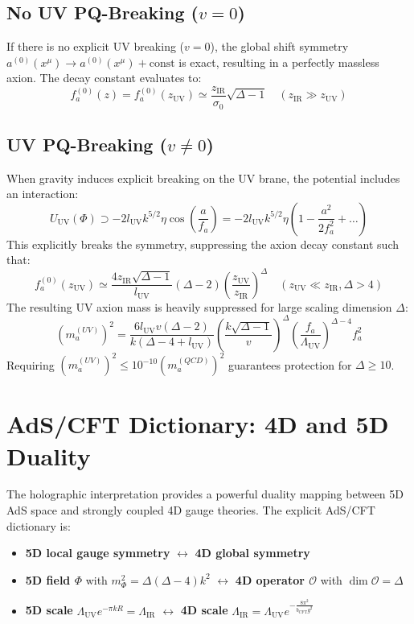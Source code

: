 \documentclass[11pt]{article}
\begin{document}
\subsection{No UV PQ-Breaking ($v = 0$)}
If there is no explicit UV breaking ($v = 0$), the global shift symmetry $a^{(0)}(x^\mu) \to a^{(0)}(x^\mu) + \text{const}$ is exact, resulting in a perfectly massless axion. The decay constant evaluates to:
\begin{equation}
    f_a^{(0)}(z) = f_a^{(0)}(z_{\text{UV}}) \simeq \frac{z_{\text{IR}}}{\sigma_0} \sqrt{\Delta-1} \quad (z_{\text{IR}} \gg z_{\text{UV}})
\end{equation}

\subsection{UV PQ-Breaking ($v \neq 0$)}
When gravity induces explicit breaking on the UV brane, the potential includes an interaction:
\begin{equation}
    U_{\text{UV}}(\Phi) \supset -2 l_{\text{UV}} k^{5/2} \eta \cos\left(\frac{a}{f_a}\right) = -2 l_{\text{UV}} k^{5/2} \eta \left(1 - \frac{a^2}{2f_a^2} + \dots \right)
\end{equation}
This explicitly breaks the symmetry, suppressing the axion decay constant such that:
\begin{equation}
    f_a^{(0)}(z_{\text{UV}}) \simeq \frac{4 z_{\text{IR}} \sqrt{\Delta-1}}{l_{\text{UV}}} (\Delta-2) \left(\frac{z_{\text{UV}}}{z_{\text{IR}}}\right)^\Delta \quad (z_{\text{UV}} \ll z_{\text{IR}}, \Delta > 4)
\end{equation}
The resulting UV axion mass is heavily suppressed for large scaling dimension $\Delta$:
\begin{equation}
    (m_a^{(UV)})^2 = \frac{6 l_{\text{UV}} v (\Delta-2)}{k(\Delta-4+l_{\text{UV}})} \left( \frac{k\sqrt{\Delta-1}}{v} \right)^\Delta \left(\frac{f_a}{\Lambda_{\text{UV}}}\right)^{\Delta-4} f_a^2
\end{equation}
Requiring $(m_a^{(UV)})^2 \le 10^{-10} (m_a^{(QCD)})^2$ guarantees protection for $\Delta \ge 10$.

\section{AdS/CFT Dictionary: 4D and 5D Duality}
The holographic interpretation provides a powerful duality mapping between 5D AdS space and strongly coupled 4D gauge theories. The explicit AdS/CFT dictionary is:
\begin{itemize}
    \item \textbf{5D local gauge symmetry} $\leftrightarrow$ \textbf{4D global symmetry}
    \item \textbf{5D field $\Phi$} with $m_\Phi^2 = \Delta(\Delta-4)k^2$ $\leftrightarrow$ \textbf{4D operator $\mathcal{O}$} with $\dim \mathcal{O} = \Delta$
    \item \textbf{5D scale} $\Lambda_{\text{UV}} e^{-\pi k R} = \Lambda_{\text{IR}}$ $\leftrightarrow$ \textbf{4D scale} $\Lambda_{\text{IR}} = \Lambda_{\text{UV}} e^{-\frac{8\pi^2}{b_{\text{CFT}} g^2}}$
\end{itemize}
\end{document}
